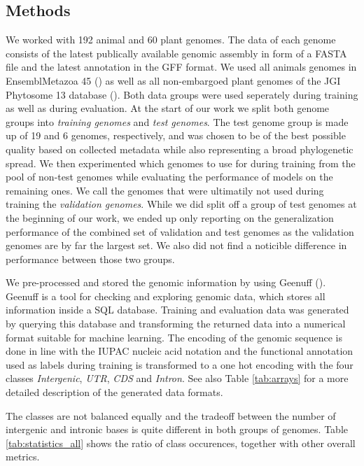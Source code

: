 \documentclass{bioinfo}
\begin{document}
\begin{methods}
\section{Methods}
We worked with 192 animal and 60 plant genomes. The data of each genome consists of the latest publically available genomic assembly in form of a FASTA file and the latest annotation in the GFF format. We used all animals genomes in EnsemblMetazoa 45 (\citealp{Howe19}) as well as all non-embargoed plant genomes of the JGI Phytosome 13 database (\citealp{Phytozome}). Both data groups were used seperately during training as well as during evaluation. At the start of our work we split both genome groups into {\it training genomes} and {\it test genomes}. The test genome group is made up of 19 and 6 genomes, respectively, and was chosen to be of the best possible quality based on collected metadata while also representing a broad phylogenetic spread. We then experimented which genomes to use for during training from the pool of non-test genomes while evaluating the performance of models on the remaining ones. We call the genomes that were ultimatily not used during training the {\it validation genomes}. While we did split off a group of test genomes at the beginning of our work, we ended up only reporting on the generalization performance of the combined set of validation and test genomes as the validation genomes are by far the largest set. We also did not find a noticible difference in performance between those two groups. 

We pre-processed and stored the genomic information by using Geenuff (\citealp{Denton19}). Geenuff is a tool for checking and exploring genomic data, which stores all information inside a SQL database. Training and evaluation data was generated by querying this database and transforming the returned data into a numerical format suitable for machine learning. The encoding of the genomic sequence is done in line with the IUPAC nucleic acid notation and the functional annotation used as labels during training is transformed to a one hot encoding with the four classes {\it Intergenic}, {\it UTR}, {\it CDS} and {\it Intron}. See also Table \ref{tab:arrays} for a more detailed description of the generated data formats.

The classes are not balanced equally and the tradeoff between the number of intergenic and intronic bases is quite different in both groups of genomes. Table \ref{tab:statistics_all} shows the ratio of class occurences, together with other overall metrics.


\end{methods}
\end{document}
